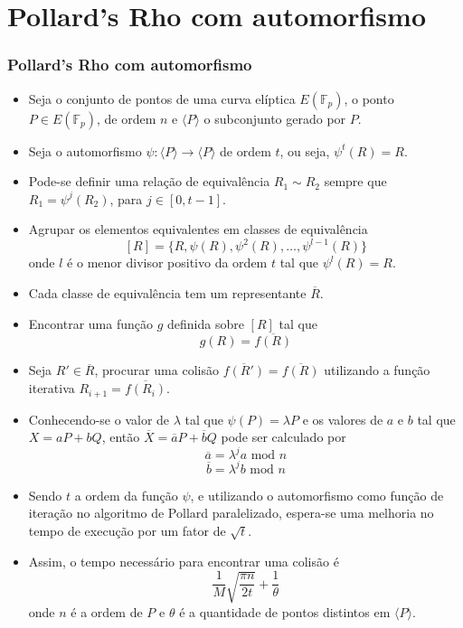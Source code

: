 \documentclass{beamer}
\begin{document}
\section{Pollard's Rho com automorfismo}
\begin{frame}
\frametitle{Pollard's Rho com automorfismo}
  \begin{itemize}
    \item Seja o conjunto de pontos de uma curva elíptica $E(\mathbb{F}_p)$, o ponto $P \in E(\mathbb{F}_p)$, de ordem $n$ e $\langle P \rangle$ o subconjunto gerado por $P$.
    \item Seja o automorfismo $\psi: \langle P \rangle \to \langle P \rangle$ de ordem $t$, ou seja, $\psi^t(R) = R$.
    \item Pode-se definir uma relação de equivalência $R_1 \sim R_2$ sempre que $R_1 = \psi^j(R_2)$, para $j \in [0, t-1]$.
    \item Agrupar os elementos equivalentes em classes de equivalência
    $$
      [R] = \{R, \psi(R), \psi^2(R), \dots, \psi^{l-1}(R)\}
    $$
    onde $l$ é o menor divisor positivo da ordem $t$ tal que $\psi^l(R) = R$.
  \end{itemize}
\end{frame}
\begin{frame}
  \begin{itemize}
    \item Cada classe de equivalência tem um representante $\overline{R}$.
    \item Encontrar uma função $g$ definida sobre $[R]$ tal que
    $$
      g(R) = \overline{f(R)}
    $$
    \item Seja $R' \in \overline{R}$, procurar uma colisão $\overline{f(R')} = \overline{f(R)}$ utilizando a função iterativa $R_{i+1} = \overline{f(R_i)}$.
    \item Conhecendo-se o valor de $\lambda$ tal que $\psi(P) = \lambda P$ e os valores de $a$ e $b$ tal que $X = aP + bQ$, então $\overline{X} = \overline{a}P + \overline{b}Q$ pode ser calculado por
    $$
      \overline{a} = \lambda^j a \mbox{ mod } n
    $$
    $$
      \overline{b} = \lambda^j b \mbox{ mod } n
    $$
  \end{itemize}
\end{frame}
\begin{frame}
  \begin{itemize}
    \item Sendo $t$ a ordem da função $\psi$, e utilizando o automorfismo como função de iteração no algoritmo de Pollard paralelizado, espera-se uma melhoria no tempo de execução por um fator de $\sqrt{t}$.
    \item Assim, o tempo necessário para encontrar uma colisão é
    $$
      \frac{1}{M}\sqrt{\frac{\pi n}{2t}} + \frac{1}{\theta}
    $$
    onde $n$ é a ordem de $P$ e $\theta$ é a quantidade de pontos distintos em $\langle P \rangle$.
  \end{itemize}
\end{frame}
\end{document}
